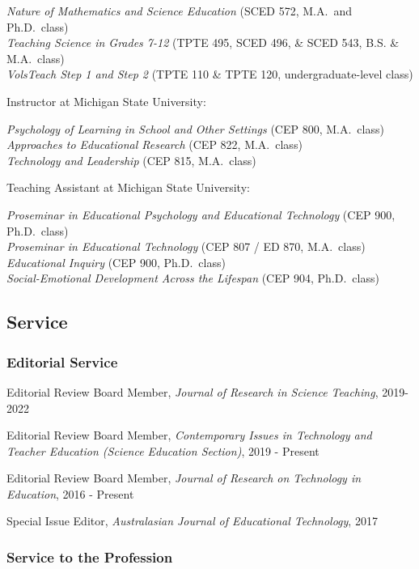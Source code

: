 \documentclass[14,]{article}
\begin{document}
\emph{Nature of Mathematics and Science Education} (SCED 572, M.A.~and
Ph.D.~class)\\
\emph{Teaching Science in Grades 7-12} (TPTE 495, SCED 496, \& SCED 543,
B.S. \& M.A.~class)\\
\emph{VolsTeach Step 1 and Step 2} (TPTE 110 \& TPTE 120,
undergraduate-level class)

Instructor at Michigan State University:

\emph{Psychology of Learning in School and Other Settings} (CEP 800,
M.A.~class)\\
\emph{Approaches to Educational Research} (CEP 822, M.A.~class)\\
\emph{Technology and Leadership} (CEP 815, M.A.~class)

Teaching Assistant at Michigan State University:

\emph{Proseminar in Educational Psychology and Educational Technology}
(CEP 900, Ph.D.~class)\\
\emph{Proseminar in Educational Technology} (CEP 807 / ED 870,
M.A.~class)\\
\emph{Educational Inquiry} (CEP 900, Ph.D.~class)\\
\emph{Social-Emotional Development Across the Lifespan} (CEP 904,
Ph.D.~class)

\hypertarget{service}{%
\subsection{Service}\label{service}}

\hypertarget{editorial-service}{%
\subsubsection{Editorial Service}\label{editorial-service}}

Editorial Review Board Member, \emph{Journal of Research in Science
Teaching}, 2019-2022

Editorial Review Board Member, \emph{Contemporary Issues in Technology
and Teacher Education (Science Education Section)}, 2019 - Present

Editorial Review Board Member, \emph{Journal of Research on Technology
in Education}, 2016 - Present

Special Issue Editor, \emph{Australasian Journal of Educational
Technology}, 2017

\hypertarget{service-to-the-profession}{%
\subsubsection{Service to the
Profession}\label{service-to-the-profession}}
\end{document}
